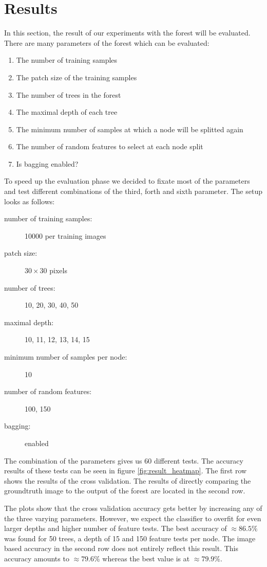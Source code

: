 \section{Results}
\label{sec:results}

In this section, the result of our experiments with the forest will be evaluated. There are many parameters
of the forest which can be evaluated:

\FloatBarrier
\begin{enumerate}
	\item The number of training samples
	\item The patch size of the training samples
	\item The number of trees in the forest
	\item The maximal depth of each tree
	\item The minimum number of samples at which a node will be splitted again
	\item The number of random features to select at each node split
	\item Is bagging enabled?
\end{enumerate}
\FloatBarrier

To speed up the evaluation phase we decided to fixate most of the parameters and test different combinations
of the third, forth and sixth parameter. The setup looks as follows:

\FloatBarrier
\begin{description}
	\item[number of training samples:] 10000 per training images
	\item[patch size:] $30 \times 30$ pixels
	\item[number of trees:] 10, 20, 30, 40, 50
	\item[maximal depth:] 10, 11, 12, 13, 14, 15
	\item[minimum number of samples per node:] 10
	\item[number of random features:] 100, 150
	\item[bagging:] enabled
\end{description}
\FloatBarrier

The combination of the parameters gives us 60 different tests. The accuracy results of these tests can be seen
in figure \ref{fig:result_heatmap}. The first row shows the results of the cross validation. The results
of directly comparing the groundtruth image to the output of the forest are located in the second row. 

The plots show that the cross validation accuracy gets better by increasing any of the three varying parameters.
However, we expect the classifier to overfit for even larger depths and higher number of feature tests. The best
accuracy of $\approx 86.5\%$ was found for 50 trees, a depth of 15 and 150 feature tests per node. The image based
accuracy in the second row does not entirely reflect this result. This accuracy amounts to $\approx 79.6\%$ whereas
the best value is at $\approx 79.9\%$.


